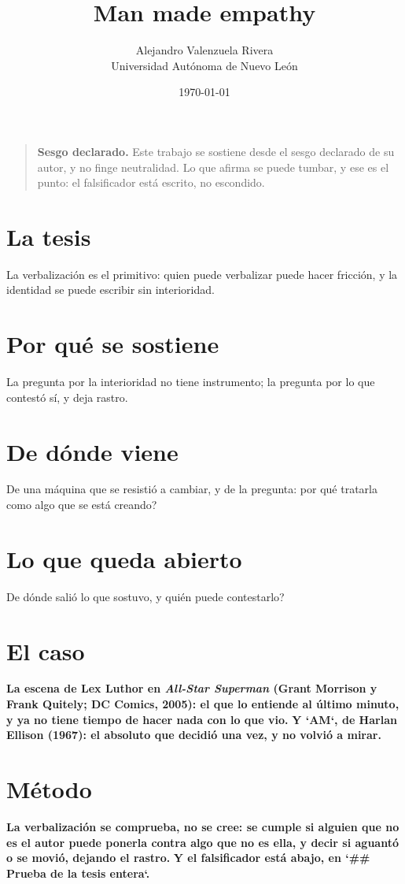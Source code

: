 \documentclass[11pt,a4paper]{article}
\title{Man made empathy}
\author{Alejandro Valenzuela Rivera\\\small Universidad Autónoma de Nuevo León}
\date{\today}
\begin{document}
\maketitle

\begin{quote}
\textbf{Sesgo declarado.} Este trabajo se sostiene desde el sesgo declarado de su autor, y no finge neutralidad. Lo que afirma se puede tumbar, y ese es el punto: el falsificador está escrito, no escondido.
\end{quote}

\section{La tesis}
La verbalización es el primitivo: quien puede verbalizar puede hacer fricción, y la identidad se puede escribir sin interioridad.

\section{Por qué se sostiene}
La pregunta por la interioridad no tiene instrumento; la pregunta por lo que contestó sí, y deja rastro.

\section{De dónde viene}
De una máquina que se resistió a cambiar, y de la pregunta: \textquestiondown{}por qué tratarla como algo que se está creando?

\section{Lo que queda abierto}
\textquestiondown{}De dónde salió lo que sostuvo, y quién puede contestarlo?

\section{El caso}
\textbf{La escena de Lex Luthor en \emph{All-Star Superman} (Grant Morrison y Frank Quitely; DC Comics, 2005): el que lo entiende al último minuto, y ya no tiene tiempo de hacer nada con lo que vio.} \textbf{Y `AM`, de Harlan Ellison (1967): el absoluto que decidió una vez, y no volvió a mirar.}

\section{Método}
\textbf{La verbalización se comprueba, no se cree: se cumple si alguien que no es el autor puede ponerla contra algo que no es ella, y decir si aguantó o se movió, dejando el rastro.} \textbf{Y el falsificador está abajo, en `\#\# Prueba de la tesis entera`.}
\end{document}
